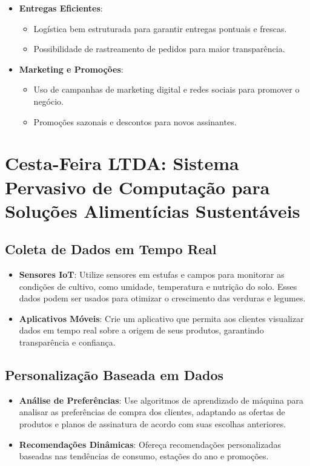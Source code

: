 \documentclass{article}
\begin{document}
\begin{itemize}
    \item \textbf{Entregas Eficientes}:
    \begin{itemize}
        \item Logística bem estruturada para garantir entregas pontuais e frescas.
        \item Possibilidade de rastreamento de pedidos para maior transparência.
    \end{itemize}

    \item \textbf{Marketing e Promoções}:
    \begin{itemize}
        \item Uso de campanhas de marketing digital e redes sociais para promover o negócio.
        \item Promoções sazonais e descontos para novos assinantes.
    \end{itemize}
\end{itemize}

\section{Cesta-Feira LTDA: Sistema Pervasivo de Computação para Soluções Alimentícias Sustentáveis}

\subsection{Coleta de Dados em Tempo Real}
\begin{itemize}
    \item \textbf{Sensores IoT}: Utilize sensores em estufas e campos para monitorar as condições de cultivo, como umidade, temperatura e nutrição do solo. Esses dados podem ser usados para otimizar o crescimento das verduras e legumes.
    \item \textbf{Aplicativos Móveis}: Crie um aplicativo que permita aos clientes visualizar dados em tempo real sobre a origem de seus produtos, garantindo transparência e confiança.
\end{itemize}

\subsection{Personalização Baseada em Dados}
\begin{itemize}
    \item \textbf{Análise de Preferências}: Use algoritmos de aprendizado de máquina para analisar as preferências de compra dos clientes, adaptando as ofertas de produtos e planos de assinatura de acordo com suas escolhas anteriores.
    \item \textbf{Recomendações Dinâmicas}: Ofereça recomendações personalizadas baseadas nas tendências de consumo, estações do ano e promoções.
\end{itemize}
\end{document}
